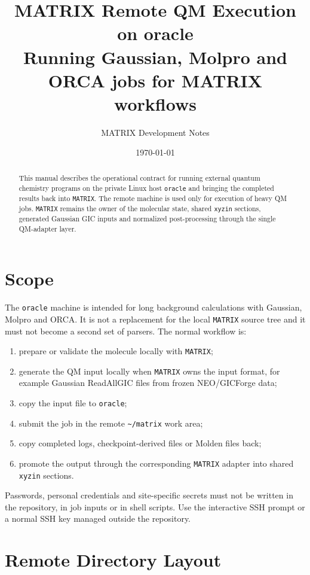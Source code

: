 \documentclass[11pt]{article}
\title{\textbf{MATRIX Remote QM Execution on oracle}\\
\large Running Gaussian, Molpro and ORCA jobs for MATRIX workflows}
\author{MATRIX Development Notes}
\date{\today}
\newcommand{\framework}{\texttt{MATRIX}}
\newcommand{\host}{\texttt{oracle}}
\newcommand{\xyzin}{\texttt{xyzin}}
\begin{document}
\maketitle

\begin{abstract}
This manual describes the operational contract for running external quantum
chemistry programs on the private Linux host \host{} and bringing the completed
results back into \framework{}.  The remote machine is used only for execution
of heavy QM jobs.  \framework{} remains the owner of the molecular state,
shared \xyzin{} sections, generated Gaussian GIC inputs and normalized
post-processing through the single QM-adapter layer.
\end{abstract}

\tableofcontents
\newpage

\section{Scope}

The \host{} machine is intended for long background calculations with Gaussian,
Molpro and ORCA.  It is not a replacement for the local \framework{} source
tree and it must not become a second set of parsers.  The normal workflow is:

\begin{enumerate}
  \item prepare or validate the molecule locally with \framework{};
  \item generate the QM input locally when \framework{} owns the input format,
        for example Gaussian ReadAllGIC files from frozen NEO/GICForge data;
  \item copy the input file to \host{};
  \item submit the job in the remote \texttt{\textasciitilde/matrix} work area;
  \item copy completed logs, checkpoint-derived files or Molden files back;
  \item promote the output through the corresponding \framework{} adapter into
        shared \xyzin{} sections.
\end{enumerate}

Passwords, personal credentials and site-specific secrets must not be written
in the repository, in job inputs or in shell scripts.  Use the interactive SSH
prompt or a normal SSH key managed outside the repository.

\section{Remote Directory Layout}
\end{document}
